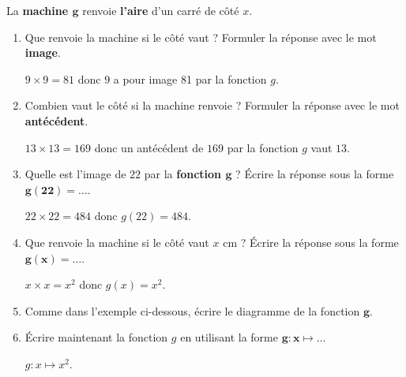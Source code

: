 \begin{corrige}
    La \textbf{machine $\boldsymbol{g}$} renvoie \textbf{l'aire} d'un carré de côté $x$.

    \hspace*{-13mm}
    
    \begin{enumerate}
        \item Que renvoie la machine si le côté vaut   ? Formuler la réponse avec le mot \textbf{image}.
        
        {\red $9\times 9 = 81$ donc $9$ a pour image 81 par la fonction $g$.}
        \item Combien vaut le côté si la machine renvoie   ? Formuler la réponse avec le mot \textbf{antécédent}.
        
        {\red $13\times 13 = 169$ donc un antécédent de $169$ par la fonction $g$ vaut $13$.}
        \item Quelle est l'image de $22$ par la \textbf{fonction $\boldsymbol{g}$} ? Écrire la réponse sous la forme $\boldsymbol{g(22)=\ldots}$.
        
        {\red $22\times 22 = 484$ donc $g(22)=484$.}
        \item Que renvoie la machine si le côté vaut $x$ cm ? Écrire la réponse sous la forme $\boldsymbol{g(x)=\ldots}$.
        
        {\red $x\times x = x^2$ donc $g(x)=x^2$.}
        \item Comme dans l'exemple ci-dessous, écrire le diagramme de la fonction $\boldsymbol{g}$.
        
        \medskip
        \item Écrire maintenant la fonction $g$ en utilisant la forme $\boldsymbol{g:x} \longmapsto \ldots$
        
        {\red $g : x \longmapsto x^2$.}
    \end{enumerate}
\end{corrige}
